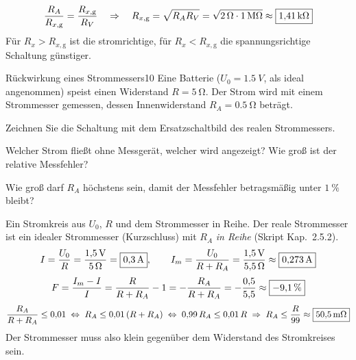 \documentclass[11pt,a4paper]{article}
\begin{document}
\begin{loesung}
\[
  \frac{R_A}{R_{x,\text{g}}} = \frac{R_{x,\text{g}}}{R_V}
  \quad\Rightarrow\quad R_{x,\text{g}} = \sqrt{R_A R_V} = \sqrt{\SI{2}{\ohm}\cdot\SI{1}{M\ohm}} \approx \boxed{\SI{1.41}{k\ohm}}
\]
Für $R_x > R_{x,\text{g}}$ ist die stromrichtige, für $R_x < R_{x,\text{g}}$ die spannungsrichtige Schaltung günstiger.
\end{loesung}

\begin{aufgabe}{Rückwirkung eines Strommessers}{10}
Eine Batterie ($U_0 = \SI{1.5}{V}$, als ideal angenommen) speist einen Widerstand $R = \SI{5}{\ohm}$. Der Strom wird mit einem Strommesser gemessen, dessen Innenwiderstand $R_A = \SI{0.5}{\ohm}$ beträgt.
\begin{teilaufgaben}
  \item Zeichnen Sie die Schaltung mit dem Ersatzschaltbild des realen Strommessers.
  \item Welcher Strom fließt ohne Messgerät, welcher wird angezeigt? Wie groß ist der relative Messfehler?
  \item Wie groß darf $R_A$ höchstens sein, damit der Messfehler betragsmäßig unter $\SI{1}{\percent}$ bleibt?
\end{teilaufgaben}
\end{aufgabe}

\begin{loesung}
Ein Stromkreis aus $U_0$, $R$ und dem Strommesser in Reihe. Der reale Strommesser ist ein idealer Strommesser (Kurzschluss) mit $R_A$ \emph{in Reihe} (Skript Kap.~2.5.2).
\[
  I = \frac{U_0}{R} = \frac{\SI{1.5}{V}}{\SI{5}{\ohm}} = \boxed{\SI{0.3}{A}},\qquad
  I_m = \frac{U_0}{R+R_A} = \frac{\SI{1.5}{V}}{\SI{5.5}{\ohm}} \approx \boxed{\SI{0.273}{A}}
\]
\[
  F = \frac{I_m - I}{I} = \frac{R}{R+R_A}-1 = -\frac{R_A}{R+R_A} = -\frac{0{,}5}{5{,}5} \approx \boxed{\SI{-9.1}{\percent}}
\]
\[
  \frac{R_A}{R+R_A} \le 0{,}01 \;\Leftrightarrow\; R_A \le 0{,}01\,(R+R_A) \;\Leftrightarrow\; 0{,}99\,R_A \le 0{,}01\,R
  \;\Rightarrow\; R_A \le \frac{R}{99} \approx \boxed{\SI{50.5}{m\ohm}}
\]
Der Strommesser muss also klein gegenüber dem Widerstand des Stromkreises sein.
\end{loesung}
\end{document}
